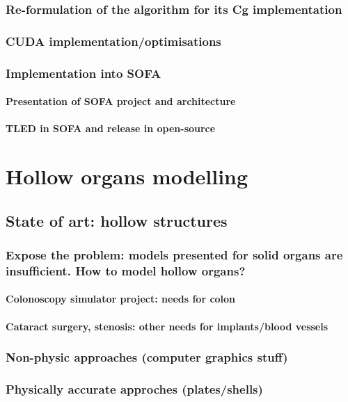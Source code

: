 		\section{Re-formulation of the algorithm for its Cg implementation}
		\section{CUDA implementation/optimisations }
		\section{Implementation into SOFA}
			\subsection{Presentation of SOFA project and architecture}
			\subsection{TLED in SOFA and release in open-source}



\part{Hollow organs modelling}

	\chapter{State of art: hollow structures}
		\section{Expose the problem: models presented for solid organs are insufficient. How to model hollow organs?}
			\subsection{Colonoscopy simulator project: needs for colon}
			\subsection{Cataract surgery, stenosis: other needs for implants/blood vessels}
		\section{Non-physic approaches (computer graphics stuff)}
		\section{Physically accurate approches (plates/shells)}

